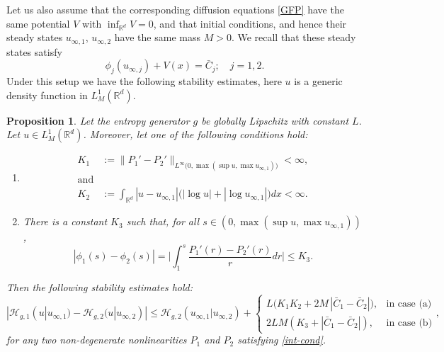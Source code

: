 \documentclass[reqno]{amsart}
\newtheorem{prop}[lemma]{Proposition}
\newcommand{\R}{\mathbb{R}}
\renewcommand{\H}{{\mathcal{H}}}
\begin{document}
Let us also assume that the corresponding diffusion equations \eqref{GFP} have the same potential $V$ with $\inf_{\R^d} V=0$, and that initial conditions, and hence their steady states $u_{\infty,1}$, $u_{\infty,2}$ have the same mass $M>0$. We recall that these steady states satisfy
\begin{equation}\label{C-bar}
  \phi_j(u_{\infty,j})+V(x)=\bar C_j;\quad j=1,2.
\end{equation}
Under this setup we have the following stability estimates, here $u$ is a generic density function in $L^1_M(\R^d)$.
%
\begin{prop}
    Let the entropy generator $g$ be globally Lipschitz with constant $L$. Let $u\in L^1_M(\R^d)$. Moreover, let one of the following conditions hold:
    \begin{enumerate}
        \item[(a)] 
        \begin{align*}
          K_1&:=\|P_1'-P_2'\|_{L^\infty\big(0,\max(\sup u,\max u_{\infty,1})\big)} <\infty, \\
          \mbox{and}& \\
          K_2&:=\int_{\R^d} |u-u_{\infty,1}|\big(|\log u|+|\log u_{\infty,1}|\big)dx < \infty. 
        \end{align*}
        \item[(b)] There is a constant $K_3$ such that, for all $s\in(0,\max(\sup u,\max u_{\infty,1}))$,
        \begin{equation}\label{Delta-phi}
        |\phi_1(s)-\phi_2(s)| = \Big|\int_1^s \frac{P_1'(r)-P_2'(r)}{r} dr\Big| \le K_3.
        \end{equation}
    \end{enumerate}
    Then the following stability estimates hold:
    \begin{equation*}%
       |\H_{g,1}(u|u_{\infty,1}) - \H_{g,2}(u|u_{\infty,2})| \le
       \H_{g,2}(u_{\infty,1}|u_{\infty,2}) +\left\{ \begin{array}{rc} {\displaystyle L\Big( K_1 K_2 + 2M\,|\bar C_1-\bar C_2|\Big)}, & \mbox{in case (a)}\\[0.3cm]
 2LM(K_3+|\bar C_1-\bar C_2|), & \mbox{in case (b)}\end{array}\right., \nonumber
    \end{equation*}
for any two non-degenerate nonlinearities $P_1$ and $P_2$ satisfying \eqref{int-cond}.
\end{prop}
%
\end{document}
